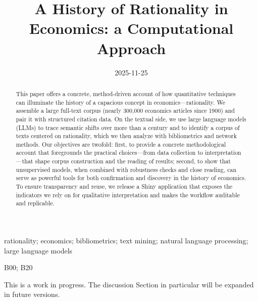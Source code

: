 \documentclass[
]{interact}
\title{A History of Rationality in Economics: a Computational Approach}
\author{}
\date{2025-11-25}
\begin{document}
\maketitle



\begin{abstract}
This paper offers a concrete, method-driven account of how quantitative techniques can illuminate the history of a capacious concept in economics—rationality. We assemble a large full-text corpus (nearly 300,000 economics articles since 1900) and pair it with structured citation data. On the textual side, we use large language models (LLMs) to trace semantic shifts over more than a century and to identify a corpus of texts centered on rationality, which we then analyze with bibliometrics and network methods. Our objectives are twofold: first, to provide a concrete methodological account that foregrounds the practical choices—from data collection to interpretation—that shape corpus construction and the reading of results; second, to show that unsupervised models, when combined with robustness checks and close reading, can serve as powerful tools for both confirmation and discovery in the history of economics. To ensure transparency and reuse, we release a Shiny application that exposes the indicators we rely on for qualitative interpretation and makes the workflow auditable and replicable.
\end{abstract}

\begin{keywords}
rationality; economics; bibliometrics; text mining; natural language processing; large language models
\end{keywords}

\begin{jelcode}
B00; B20
\end{jelcode}

\begin{tcolorbox}[enhanced jigsaw, bottomtitle=1mm, left=2mm, title=\textcolor{quarto-callout-warning-color}{\faExclamationTriangle}\hspace{0.5em}{Warning}, leftrule=.75mm, colframe=quarto-callout-warning-color-frame, opacityback=0, arc=.35mm, toptitle=1mm, colbacktitle=quarto-callout-warning-color!10!white, breakable, rightrule=.15mm, coltitle=black, titlerule=0mm, colback=white, opacitybacktitle=0.6, toprule=.15mm, bottomrule=.15mm]

This is a work in progress. The discussion Section in particular will be
expanded in future versions.

\end{tcolorbox}
\end{document}
